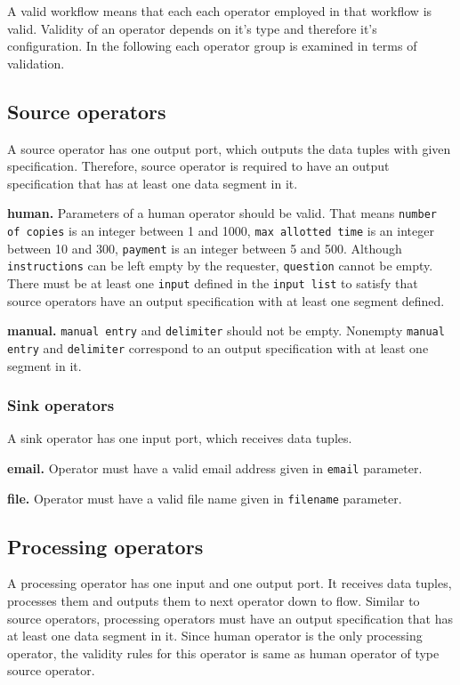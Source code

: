 A valid workflow means that each each operator employed in that workflow is valid. Validity of 
an operator depends on it's type and therefore it's configuration. In the following each operator 
group is examined in terms of validation.

\subsection{Source operators}
A source operator has one output port, which outputs the data tuples with given specification. 
Therefore, source operator is required to have an output specification that has at least one data 
segment in it.

\textbf{human.} 
Parameters of a human operator should be valid. That means 
\texttt{number of copies} is an integer between 1 and 1000, 
\texttt{max allotted time} is an integer between 10 and 300, 
\texttt{payment} is an integer between 5 and 500. 
Although \texttt{instructions} can be left empty by the requester, \texttt{question} cannot be 
empty. There must be at least one \texttt{input} defined in the \texttt{input list} to satisfy that 
source operators have an output specification with at least one segment defined.

\textbf{manual.} 
\texttt{manual entry} and \texttt{delimiter} should not be empty. Nonempty \texttt{manual entry} 
and \texttt{delimiter} correspond to an output specification with at least one segment in it.

\subsubsection{Sink operators}
A sink operator has one input port, which receives data tuples.

\textbf{email.} 
Operator must have a valid email address given in \texttt{email} parameter.

\textbf{file.} 
Operator must have a valid file name given in \texttt{filename} parameter.

\subsection{Processing operators}
A processing operator has one input and one output port. It receives data tuples, processes 
them and outputs them to next operator down to flow. Similar to source operators, processing 
operators must have an output specification that has at least one data segment in it. Since 
human operator is the only processing operator, the validity rules for this operator is same as 
human operator of type source operator.

